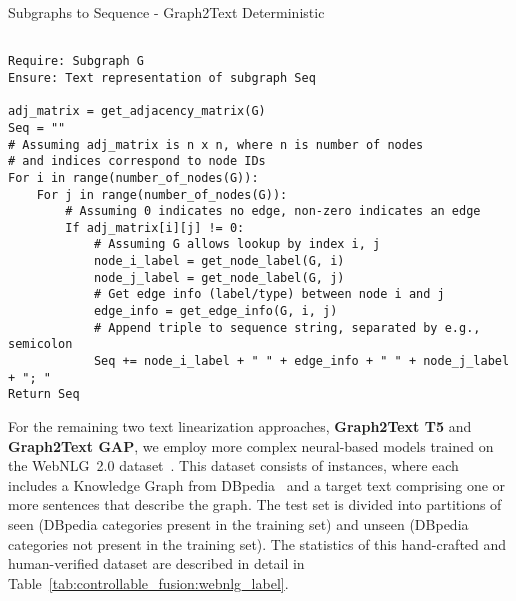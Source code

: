 \begin{ListingEnv}[p]
    \centering %
    \caption{Subgraphs to Sequence - Graph2Text Deterministic} 
    \label{alg:controllable_fusion:sub2seq} 
    \begin{lstlisting}[basicstyle=\fontsize{10pt}{12pt}\selectfont\ttfamily] % Smaller font for code

Require: Subgraph G
Ensure: Text representation of subgraph Seq

adj_matrix = get_adjacency_matrix(G)
Seq = ""
# Assuming adj_matrix is n x n, where n is number of nodes
# and indices correspond to node IDs
For i in range(number_of_nodes(G)): 
    For j in range(number_of_nodes(G)):
        # Assuming 0 indicates no edge, non-zero indicates an edge
        If adj_matrix[i][j] != 0: 
            # Assuming G allows lookup by index i, j
            node_i_label = get_node_label(G, i) 
            node_j_label = get_node_label(G, j)
            # Get edge info (label/type) between node i and j
            edge_info = get_edge_info(G, i, j) 
            # Append triple to sequence string, separated by e.g., semicolon
            Seq += node_i_label + " " + edge_info + " " + node_j_label + "; " 
Return Seq
    \end{lstlisting}
\end{ListingEnv}

For the remaining two text linearization approaches, \textbf{Graph2Text T5} and \textbf{Graph2Text GAP}, we employ more complex neural-based models trained on the WebNLG~2.0 dataset~\cite{DBLP:conf/acl/GardentSNP17}. This dataset consists of instances, where each includes a Knowledge Graph from DBpedia~\cite{DBLP:conf/semweb/AuerBKLCI07} and a target text comprising one or more sentences that describe the graph. The test set is divided into partitions of seen (DBpedia categories present in the training set) and unseen (DBpedia categories not present in the training set). The statistics of this hand-crafted and human-verified dataset are described in detail in Table~\ref{tab:controllable_fusion:webnlg_label}. 


